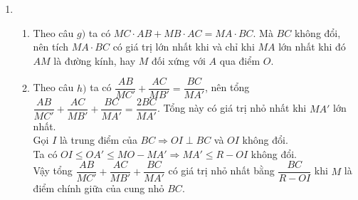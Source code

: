\begin{bt}
{\begin{enumerate}
			$\triangle MAC \backsim \triangle MBD \Rightarrow \dfrac{AC}{BD} = \dfrac{MA}{MB} = \dfrac{MB'}{MA'}\Rightarrow \dfrac{AC}{MB'} = \dfrac{BD}{MA'}$.\\
			
			Từ đó suy ra $\dfrac{AB}{MC'} + \dfrac{AC}{MB'} = \dfrac{BC}{MA'}$.
			\item 
			\begin{enumerate}[1)]
				\item 
				Theo câu $g)$ ta có $MC\cdot AB + MB\cdot AC = MA\cdot BC$. Mà $BC$ không đổi, nên tích $MA\cdot BC$	có giá trị lớn nhất khi và chỉ khi $MA$ lớn nhất khi đó $AM$ là đường kính, hay $M$ đối xứng với $A$ qua điểm $O$.
				\item Theo câu $h)$ ta có $\dfrac{AB}{MC'} + \dfrac{AC}{MB'} = \dfrac{BC}{MA'}$, nên tổng $\dfrac{AB}{MC'} + \dfrac{AC}{MB'} + \dfrac{BC}{MA'} = \dfrac{2BC}{MA'}$. Tổng này có giá trị nhỏ nhất khi $MA'$ lớn nhất.\\
				Gọi $I$ là trung điểm của $BC \Rightarrow OI \perp BC$ và  $OI$ không đổi. \\
				Ta có $OI \leq OA'  \leq MO - MA' \Rightarrow MA' \leq R - OI$ không đổi.\\
				Vậy tổng $\dfrac{AB}{MC'} + \dfrac{AC}{MB'} + \dfrac{BC}{MA'}$ có giá trị nhỏ nhất bằng $\dfrac{BC}{R-OI}$ khi $M$ là điểm chính giữa của cung nhỏ $BC$.
			\end{enumerate}			
		\end{enumerate}		
	}
\end{bt}










